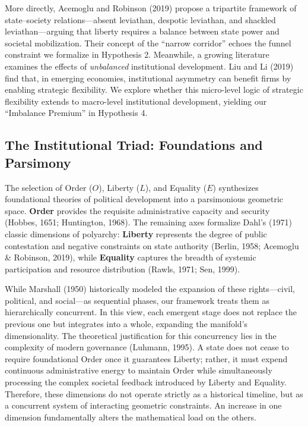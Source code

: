\documentclass[12pt]{article}
\begin{document}
More directly, Acemoglu and Robinson (2019) propose a tripartite framework of state--society relations---absent leviathan, despotic leviathan, and shackled leviathan---arguing that liberty requires a balance between state power and societal mobilization. Their concept of the “narrow corridor” echoes the funnel constraint we formalize in Hypothesis 2. Meanwhile, a growing literature examines the effects of \textit{unbalanced} institutional development. Liu and Li (2019) find that, in emerging economies, institutional asymmetry can benefit firms by enabling strategic flexibility. We explore whether this micro-level logic of strategic flexibility extends to macro-level institutional development, yielding our ``Imbalance Premium'' in Hypothesis 4.

\subsection{The Institutional Triad: Foundations and Parsimony}

The selection of Order ($O$), Liberty ($L$), and Equality ($E$) synthesizes foundational theories of political development into a parsimonious geometric space. \textbf{Order} provides the requisite administrative capacity and security (Hobbes, 1651; Huntington, 1968). The remaining axes formalize Dahl’s (1971) classic dimensions of polyarchy: \textbf{Liberty} represents the degree of public contestation and negative constraints on state authority (Berlin, 1958; Acemoglu \& Robinson, 2019), while \textbf{Equality} captures the breadth of systemic participation and resource distribution (Rawls, 1971; Sen, 1999). 

While Marshall (1950) historically modeled the expansion of these rights—civil, political, and social—as sequential phases, our framework treats them as hierarchically concurrent. In this view, each emergent stage does not replace the previous one but integrates into a whole, expanding the manifold's dimensionality. The theoretical justification for this concurrency lies in the complexity of modern governance (Luhmann, 1995). A state does not cease to require foundational Order once it guarantees Liberty; rather, it must expend continuous administrative energy to maintain Order while simultaneously processing the complex societal feedback introduced by Liberty and Equality. Therefore, these dimensions do not operate strictly as a historical timeline, but as a concurrent system of interacting geometric constraints. An increase in one dimension fundamentally alters the mathematical load on the others.
\end{document}
